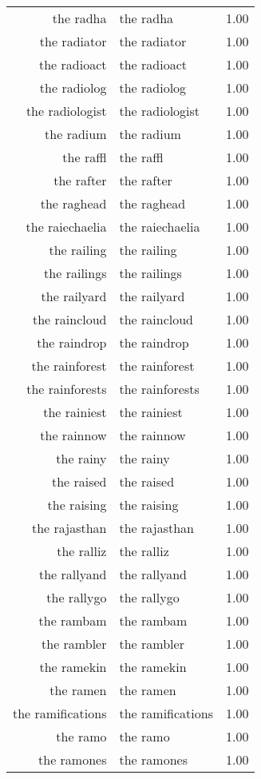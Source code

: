 \begin{table}[ht]
\begin{tabular}{rlr}
  the radha & the radha & 1.00 \\ 
  the radiator & the radiator & 1.00 \\ 
  the radioact & the radioact & 1.00 \\ 
  the radiolog & the radiolog & 1.00 \\ 
  the radiologist & the radiologist & 1.00 \\ 
  the radium & the radium & 1.00 \\ 
  the raffl & the raffl & 1.00 \\ 
  the rafter & the rafter & 1.00 \\ 
  the raghead & the raghead & 1.00 \\ 
  the raiechaelia & the raiechaelia & 1.00 \\ 
  the railing & the railing & 1.00 \\ 
  the railings & the railings & 1.00 \\ 
  the railyard & the railyard & 1.00 \\ 
  the raincloud & the raincloud & 1.00 \\ 
  the raindrop & the raindrop & 1.00 \\ 
  the rainforest & the rainforest & 1.00 \\ 
  the rainforests & the rainforests & 1.00 \\ 
  the rainiest & the rainiest & 1.00 \\ 
  the rainnow & the rainnow & 1.00 \\ 
  the rainy & the rainy & 1.00 \\ 
  the raised & the raised & 1.00 \\ 
  the raising & the raising & 1.00 \\ 
  the rajasthan & the rajasthan & 1.00 \\ 
  the ralliz & the ralliz & 1.00 \\ 
  the rallyand & the rallyand & 1.00 \\ 
  the rallygo & the rallygo & 1.00 \\ 
  the rambam & the rambam & 1.00 \\ 
  the rambler & the rambler & 1.00 \\ 
  the ramekin & the ramekin & 1.00 \\ 
  the ramen & the ramen & 1.00 \\ 
  the ramifications & the ramifications & 1.00 \\ 
  the ramo & the ramo & 1.00 \\ 
  the ramones & the ramones & 1.00 \\ 

\end{tabular}
\end{table}
